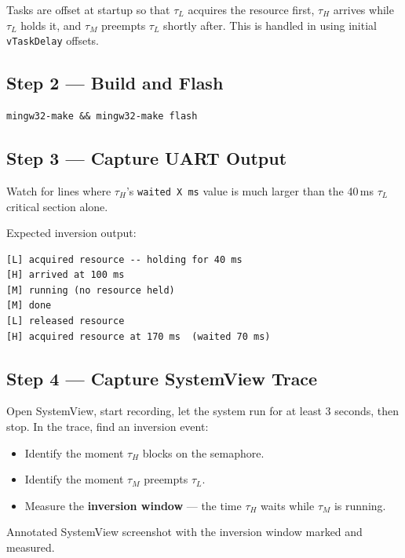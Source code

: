 \documentclass[11pt, a4paper]{article}
\begin{document}
\begin{warnbox}
  Tasks are offset at startup so that $\tau_L$ acquires the resource first, $\tau_H$
  arrives while $\tau_L$ holds it, and $\tau_M$ preempts $\tau_L$ shortly after. This is
  handled in  using initial \texttt{vTaskDelay} offsets.
\end{warnbox}

\subsection{Step 2 --- Build and Flash}

\begin{lstlisting}[style=bashstyle]
mingw32-make && mingw32-make flash
\end{lstlisting}

\subsection{Step 3 --- Capture UART Output}

Watch for lines where $\tau_H$'s \texttt{waited X ms} value is much larger than the
40\,ms $\tau_L$ critical section alone.

Expected inversion output:
\begin{lstlisting}[style=textstyle]
[L] acquired resource -- holding for 40 ms
[H] arrived at 100 ms
[M] running (no resource held)
[M] done
[L] released resource
[H] acquired resource at 170 ms  (waited 70 ms)
\end{lstlisting}

\subsection{Step 4 --- Capture SystemView Trace}

Open SystemView, start recording, let the system run for at least 3 seconds, then stop.
In the trace, find an inversion event:
\begin{itemize}[noitemsep, leftmargin=*]
  \item Identify the moment $\tau_H$ blocks on the semaphore.
  \item Identify the moment $\tau_M$ preempts $\tau_L$.
  \item Measure the \textbf{inversion window} --- the time $\tau_H$ waits while $\tau_M$
        is running.
\end{itemize}

\begin{checkpointbox}[~A]
  Annotated SystemView screenshot with the inversion window marked and measured.
\end{checkpointbox}
\end{document}
